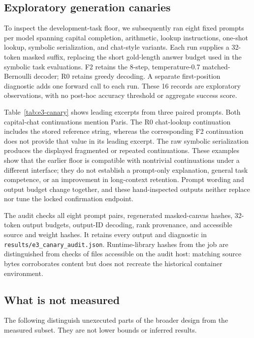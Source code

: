 \subsection{Exploratory generation canaries}
\label{m:canary}

To inspect the development-task floor, we subsequently ran eight fixed prompts per model spanning capital completion, arithmetic, lookup instructions, one-shot lookup, symbolic serialization, and chat-style variants. Each run supplies a 32-token masked suffix, replacing the short gold-length answer budget used in the symbolic task evaluations. F2 retains the 8-step, temperature-0.7 matched-Bernoulli decoder; R0 retains greedy decoding. A separate first-position diagnostic adds one forward call to each run. These 16 records are exploratory observations, with no post-hoc accuracy threshold or aggregate success score.

Table~\ref{tab:e3-canary} shows leading excerpts from three paired prompts. Both capital-chat continuations mention Paris. The R0 chat-lookup continuation includes the stored reference string, whereas the corresponding F2 continuation does not provide that value in its leading excerpt. The raw symbolic serialization produces the displayed fragmented or repeated continuations. These examples show that the earlier floor is compatible with nontrivial continuations under a different interface; they do not establish a prompt-only explanation, general task competence, or an improvement in long-context retention. Prompt wording and output budget change together, and these hand-inspected outputs neither replace nor tune the locked confirmation endpoint.

The audit checks all eight prompt pairs, regenerated masked-canvas hashes, 32-token output budgets, output-ID decoding, rank provenance, and accessible source and weight hashes. It retains every output and diagnostic in \texttt{results/e3\_canary\_audit.json}. Runtime-library hashes from the job are distinguished from checks of files accessible on the audit host: matching source bytes corroborates content but does not recreate the historical container environment.



\subsection{What is not measured}
\label{m:notmeasured}

The following distinguish unexecuted parts of the broader design from the measured subset. They are not lower bounds or inferred results.

